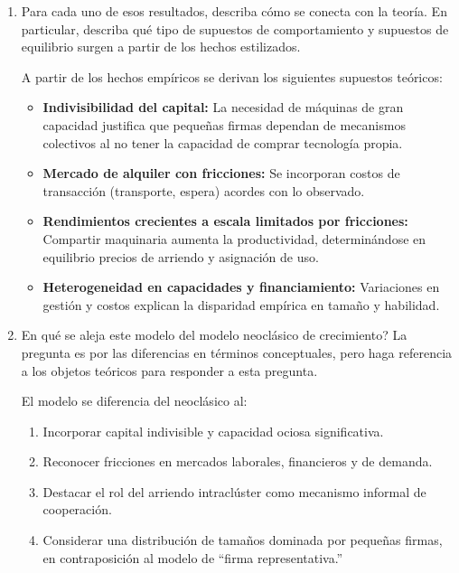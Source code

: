 \documentclass{article}
\theoremstyle{remark}
\theoremstyle{definition}
\begin{document}
\begin{enumerate}[label= (\roman*)]
\begin{tcolorbox}
    \end{tcolorbox}

\item Para cada uno de esos resultados, describa c\'omo se conecta con la teor\'ia. En particular, describa qu\'e tipo de supuestos de comportamiento y supuestos de equilibrio surgen a partir de los hechos estilizados.

     \begin{tcolorbox}

     A partir de los hechos empíricos se derivan los siguientes supuestos teóricos:
    \begin{itemize}
        \item \textbf{Indivisibilidad del capital:} La necesidad de máquinas de gran capacidad justifica que pequeñas firmas dependan de mecanismos colectivos al no tener la capacidad de comprar tecnolog\'ia propia.
        \item \textbf{Mercado de alquiler con fricciones:} Se incorporan costos de transacción (transporte, espera) acordes con lo observado.
        \item \textbf{Rendimientos crecientes a escala limitados por fricciones:} Compartir maquinaria aumenta la productividad, determinándose en equilibrio precios de arriendo y asignación de uso.
        \item \textbf{Heterogeneidad en capacidades y financiamiento:} Variaciones en gestión y costos explican la disparidad empírica en tamaño y habilidad.
    \end{itemize}
        
    \end{tcolorbox}

\item En qu\'e se aleja este modelo del modelo neocl\'asico de crecimiento? La pregunta es por las diferencias en t\'erminos conceptuales, pero haga referencia a los objetos te\'oricos para responder a esta pregunta.

     \begin{tcolorbox}

     El modelo se diferencia del neoclásico al:
    \begin{enumerate}
        \item Incorporar capital indivisible y capacidad ociosa significativa.
        \item Reconocer fricciones en mercados laborales, financieros y de demanda.
        \item Destacar el rol del arriendo intraclúster como mecanismo informal de cooperación.
        \item Considerar una distribución de tamaños dominada por pequeñas firmas, en contraposición al modelo de “firma representativa.”
    \end{enumerate}
        

\end{tcolorbox}
\end{enumerate}
\end{document}
